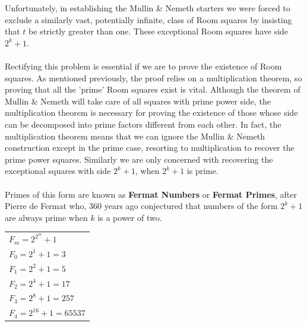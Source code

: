\documentclass[
  12pt,
  a4paper]{book}
\begin{document}
Unfortunately, in establishing the Mullin \& Nemeth starters we were
forced to exclude a similarly vast, potentially infinite, class of Room
squares by insisting that \(t\) be strictly greater than one. These
exceptional Room squares have side \(2^k+1\).\\
~\\
Rectifying this problem is essential if we are to prove the existence of
Room squares. As mentioned previously, the proof relies on a
multiplication theorem, so proving that all the 'prime' Room squares
exist is vital. Although the theorem of Mullin \& Nemeth will take care
of all squares with prime power side, the multiplication theorem is
necessary for proving the existence of those whose side can be
decomposed into prime factors different from each other. In fact, the
multiplication theorem means that we can ignore the Mullin \& Nemeth
construction except in the prime case, resorting to multiplication to
recover the prime power squares. Similarly we are only concerned with
recovering the exceptional squares with side \(2^k+1\), when \(2^k+1\)
is prime.\\
~\\
Primes of this form are known as \textbf{Fermat Numbers} or
\textbf{Fermat Primes}, after Pierre de Fermat who, 360 years ago
conjectured that numbers of the form \(2^k+1\) are always prime when
\(k\) is a power of two.

\begin{longtable}[]{@{}l@{}}
\toprule
\endhead
\(F_m=2^{2^m}+1\)\tabularnewline
\(F_0=2^1+1=3\)\tabularnewline
\(F_1=2^2+1=5\)\tabularnewline
\(F_2=2^4+1=17\)\tabularnewline
\(F_3=2^8+1=257\)\tabularnewline
\(F_4=2^{16}+1=65537\)\tabularnewline
\bottomrule
\end{longtable}
\end{document}
